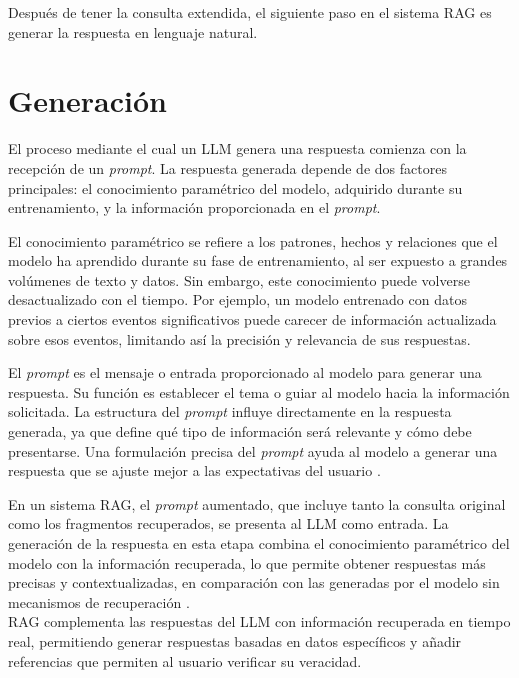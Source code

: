 \documentclass{article}
\begin{document}
Después de tener la consulta extendida, el siguiente paso en el sistema RAG es generar la respuesta en lenguaje natural.

\section{Generación}

El proceso mediante el cual un LLM genera una respuesta comienza con la recepción de un \textit{prompt}. La respuesta generada depende de dos factores principales: el conocimiento paramétrico del modelo, adquirido durante su entrenamiento, y la información proporcionada en el \textit{prompt}.

El conocimiento paramétrico se refiere a los patrones, hechos y relaciones que el modelo ha aprendido durante su fase de entrenamiento, al ser expuesto a grandes volúmenes de texto y datos. Sin embargo, este conocimiento puede volverse desactualizado con el tiempo. Por ejemplo, un modelo entrenado con datos previos a ciertos eventos significativos puede carecer de información actualizada sobre esos eventos, limitando así la precisión y relevancia de sus respuestas.

El \textit{prompt} es el mensaje o entrada proporcionado al modelo para generar una respuesta. Su función es establecer el tema o guiar al modelo hacia la información solicitada. La estructura del \textit{prompt} influye directamente en la respuesta generada, ya que define qué tipo de información será relevante y cómo debe presentarse. Una formulación precisa del \textit{prompt} ayuda al modelo a generar una respuesta que se ajuste mejor a las expectativas del usuario \cite{sahoo2024systematicsurveypromptengineering}.

En un sistema RAG, el \textit{prompt} aumentado, que incluye tanto la consulta original como los fragmentos recuperados, se presenta al LLM como entrada. La generación de la respuesta en esta etapa combina el conocimiento paramétrico del modelo con la información recuperada, lo que permite obtener respuestas más precisas y contextualizadas, en comparación con las generadas por el modelo sin mecanismos de recuperación \cite{gao2024retrievalaugmentedgenerationlargelanguage}.\\

RAG complementa las respuestas del LLM con información recuperada en tiempo real, permitiendo generar respuestas basadas en datos específicos y añadir referencias que permiten al usuario verificar su veracidad. 
\end{document}
